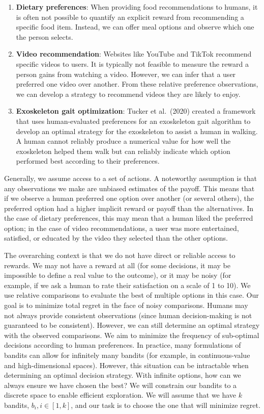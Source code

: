 \documentclass[
  letterpaper,
  numbers=noenddot,
  DIV=11]{scrreprt}
\theoremstyle{plain}
\theoremstyle{definition}
\theoremstyle{plain}
\theoremstyle{remark}
\begin{document}
\begin{enumerate}
\def\labelenumi{\arabic{enumi}.}
\item
  \textbf{Dietary preferences}: When providing food recommendations to
  humans, it is often not possible to quantify an explicit reward from
  recommending a specific food item. Instead, we can offer meal options
  and observe which one the person selects.
\item
  \textbf{Video recommendation}: Websites like YouTube and TikTok
  recommend specific videos to users. It is typically not feasible to
  measure the reward a person gains from watching a video. However, we
  can infer that a user preferred one video over another. From these
  relative preference observations, we can develop a strategy to
  recommend videos they are likely to enjoy.
\item
  \textbf{Exoskeleton gait optimization}: Tucker et al.~(2020) created a
  framework that uses human-evaluated preferences for an exoskeleton
  gait algorithm to develop an optimal strategy for the exoskeleton to
  assist a human in walking. A human cannot reliably produce a numerical
  value for how well the exoskeleton helped them walk but can reliably
  indicate which option performed best according to their preferences.
\end{enumerate}

Generally, we assume access to a set of actions. A noteworthy assumption
is that any observations we make are unbiased estimates of the payoff.
This means that if we observe a human preferred one option over another
(or several others), the preferred option had a higher implicit reward
or payoff than the alternatives. In the case of dietary preferences,
this may mean that a human liked the preferred option; in the case of
video recommendations, a user was more entertained, satisfied, or
educated by the video they selected than the other options.

The overarching context is that we do not have direct or reliable access
to rewards. We may not have a reward at all (for some decisions, it may
be impossible to define a real value to the outcome), or it may be noisy
(for example, if we ask a human to rate their satisfaction on a scale of
1 to 10). We use relative comparisons to evaluate the best of multiple
options in this case. Our goal is to minimize total regret in the face
of noisy comparisons. Humans may not always provide consistent
observations (since human decision-making is not guaranteed to be
consistent). However, we can still determine an optimal strategy with
the observed comparisons. We aim to minimize the frequency of
sub-optimal decisions according to human preferences. In practice, many
formulations of bandits can allow for infinitely many bandits (for
example, in continuous-value and high-dimensional spaces). However, this
situation can be intractable when determining an optimal decision
strategy. With infinite options, how can we always ensure we have chosen
the best? We will constrain our bandits to a discrete space to enable
efficient exploration. We will assume that we have \(k\) bandits,
\(b_i, i \in [1, k]\), and our task is to choose the one that will
minimize regret.
\end{document}

